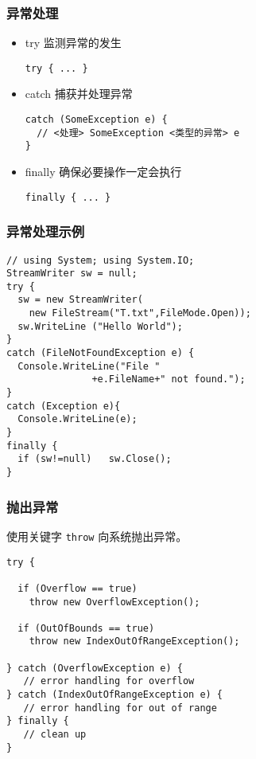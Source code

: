 \begin{frame}[fragile]
\frametitle{异常处理}
\begin{itemize}
\item try 监测异常的发生
\begin{lstlisting}
try { ... }
\end{lstlisting}
\item catch 捕获并处理异常
\begin{lstlisting}[escapeinside=<>]
catch (SomeException e) {
  // <处理> SomeException <类型的异常> e
}

\end{lstlisting}
\item finally 确保必要操作一定会执行
\begin{lstlisting}
finally { ... }
\end{lstlisting}
\end{itemize}
\end{frame}


\begin{frame}[fragile]
\frametitle{异常处理示例}
\begin{lstlisting}
// using System; using System.IO;
StreamWriter sw = null;
try {
  sw = new StreamWriter(
    new FileStream("T.txt",FileMode.Open));
  sw.WriteLine ("Hello World");
}
catch (FileNotFoundException e) {
  Console.WriteLine("File "
               +e.FileName+" not found.");
}
catch (Exception e){
  Console.WriteLine(e);
}
finally {
  if (sw!=null)   sw.Close();
}

\end{lstlisting}
\end{frame}

\begin{frame}[fragile]
\frametitle{抛出异常}
使用关键字 \texttt{throw} 向系统抛出异常。
\begin{lstlisting}
try {

  if (Overflow == true)
    throw new OverflowException();

  if (OutOfBounds == true)
    throw new IndexOutOfRangeException();

} catch (OverflowException e) {
   // error handling for overflow
} catch (IndexOutOfRangeException e) {
   // error handling for out of range
} finally {
   // clean up
}
\end{lstlisting}
\end{frame}

